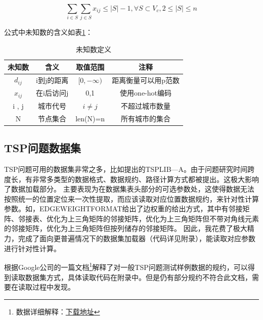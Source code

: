 \documentclass[lang=cn,11pt]{elegantpaper}
\begin{document}
\begin{equation}
    \sum_{i\in S} \sum_{j\in S} x_{i j}\leq \lvert S \rvert - 1  , \forall S \subset V_{c} , 2 \leq \lvert S \rvert \leq n
    \label{eq:binom}
\end{equation}

公式中未知数的含义如表\ref{tab:annotation of the mathematic description}：
\begin{table}[ht]
  \small
  \centering%
  \caption{未知数定义 \label{tab:annotation of the mathematic description}}
    \begin{tabular}{c c c c}%
    \toprule
        未知数    &  含义         &        取值范围    &  注释  \\
    \midrule
    $d_{ij}$     &    i到j的距离  &   $[0,-\infty) $  &  距离衡量可以用p范数  \\
    $x_{ij}$     &   在i后访问j   &      0,1         & 使用one-hot编码 \\
    i , j       &   城市代号     &  $i \neq j $       & 不超过城市数量          \\
    N       &   节点集合     &  len(N)=n       &    所有城市的集合       \\
    \bottomrule
    \end{tabular}%
\end{table}%

\subsection{TSP问题数据集}
TSP问题可用的数据集非常之多，比如\cite{tspdataset}提出的TSPLIB—A。由于问题研究时间跨度长，有非常多类型的数据格式、数据规约、路径计算方式都被提出。这极大影响了数据加载部分。
主要表现为在数据集表头部分的可选参数处，这使得数据无法按照统一的位置定位来一次性提取，而应该读取对应位置数据规约，来针对性计算参数。如，EDGEWEIGHTFORMAT给出了边权重的给出方式，其中有邻接矩阵、邻接表、优化为上三角矩阵的邻接矩阵，优化为上三角矩阵但不带对角线元素的邻接矩阵，优化为上三角矩阵但按列储存的邻接矩阵。
因此，我花费了极大精力，完成了面向更普遍情况下的数据集加载器（代码详见附录），能读取对应参数进行针对性计算。

根据Google公司的一篇文档\footnote{数据详细解释：\href{https://docs.google.com/file/d/0B4zUGKjaO9uERU1RZDNuRkg3TW8/edit?resourcekey=0-MRgfJcUZrleab5nfdCOaoQ}{下载地址}}解释了对一般TSP问题测试样例数据的规约，可以得到读取数据集方式，具体读取代码在附录中。但是仍有部分规约不符合此文档，需要在读取过程中发现。
\end{document}
